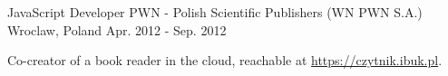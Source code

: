 \begin{cventries}
  \cventry
    {JavaScript Developer} %
    {PWN - Polish Scientific Publishers (WN PWN S.A.)} %
    {Wroclaw, Poland} %
    {Apr. 2012 - Sep. 2012} %
    {
      \begin{cvitems} %
        \item {Co-creator of a book reader in the cloud, reachable at \href{https://czytnik.ibuk.pl}{https://czytnik.ibuk.pl}.}
      \end{cvitems}
    }
\end{cventries}
